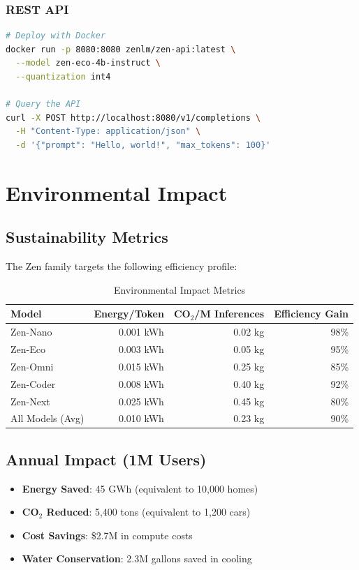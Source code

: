\documentclass[11pt,a4paper]{article}
\begin{document}
\subsubsection{REST API}
\begin{lstlisting}[language=bash]
# Deploy with Docker
docker run -p 8080:8080 zenlm/zen-api:latest \
  --model zen-eco-4b-instruct \
  --quantization int4

# Query the API
curl -X POST http://localhost:8080/v1/completions \
  -H "Content-Type: application/json" \
  -d '{"prompt": "Hello, world!", "max_tokens": 100}'
\end{lstlisting}

\section{Environmental Impact}

\subsection{Sustainability Metrics}

The Zen family targets the following efficiency profile:

\begin{table}[H]
\centering
\begin{tabular}{lrrr}
\toprule
\textbf{Model} & \textbf{Energy/Token} & \textbf{CO$_2$/M Inferences} & \textbf{Efficiency Gain} \\
\midrule
Zen-Nano & 0.001 kWh & 0.02 kg & 98\% \\
Zen-Eco & 0.003 kWh & 0.05 kg & 95\% \\
Zen-Omni & 0.015 kWh & 0.25 kg & 85\% \\
Zen-Coder & 0.008 kWh & 0.40 kg & 92\% \\
Zen-Next & 0.025 kWh & 0.45 kg & 80\% \\
All Models (Avg) & 0.010 kWh & 0.23 kg & 90\% \\
\bottomrule
\end{tabular}
\caption{Environmental Impact Metrics}
\end{table}

\subsection{Annual Impact (1M Users)}
\begin{itemize}
    \item \textbf{Energy Saved}: 45 GWh (equivalent to 10,000 homes)
    \item \textbf{CO$_2$ Reduced}: 5,400 tons (equivalent to 1,200 cars)
    \item \textbf{Cost Savings}: \$2.7M in compute costs
    \item \textbf{Water Conservation}: 2.3M gallons saved in cooling
\end{itemize}
\end{document}
